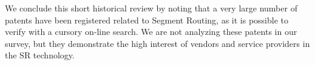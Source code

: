 We conclude this short historical review by noting that a very large number of patents have been registered related to Segment Routing, as it is possible to verify with a cursory on-line search. We are not analyzing these patents in our survey, but they demonstrate the high interest of vendors and service providers in the SR technology.



